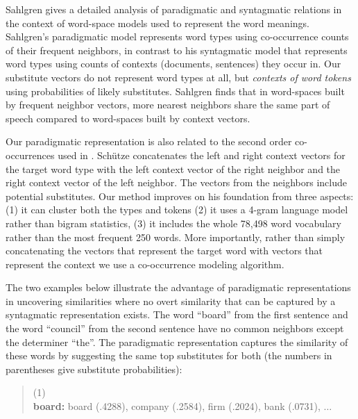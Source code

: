 Sahlgren  gives a detailed analysis of
paradigmatic and syntagmatic relations in the context of word-space
models used to represent the word meanings.  Sahlgren's paradigmatic
model represents word types using co-occurrence counts of their
frequent neighbors, in contrast to his syntagmatic model that
represents word types using counts of contexts (documents, sentences)
they occur in.  Our substitute vectors do not represent word types at
all, but {\em contexts of word tokens} using probabilities of likely
substitutes.  Sahlgren finds that in word-spaces built by frequent
neighbor vectors, more nearest neighbors share the same part of speech
compared to word-spaces built by context vectors.

Our paradigmatic representation is also related to the second order
co-occurrences used in \cite{Schutze:1995:DPT:976973.976994}.
Sch{\"u}tze concatenates the left and right context vectors for the
target word type with the left context vector of the right neighbor
and the right context vector of the left neighbor.  The vectors from
the neighbors include potential substitutes.  Our method improves on
his foundation from three aspects: (1) it can cluster both the types
and tokens (2) it uses a 4-gram language model rather than bigram
statistics, (3) it includes the whole 78,498 word vocabulary rather
than the most frequent 250 words.  More importantly, rather than
simply concatenating the vectors that represent the target word with
vectors that represent the context we use a co-occurrence modeling
algorithm.

The two examples below illustrate the advantage of paradigmatic
representations in uncovering similarities where no overt similarity
that can be captured by a syntagmatic representation exists.  The word
``board'' from the first sentence and the word ``council'' from the
second sentence have no common neighbors except the determiner
``the''.  The paradigmatic representation captures the similarity of
these words by suggesting the same top substitutes for both (the
numbers in parentheses give substitute probabilities):
\begin{quote}
 (1) \\
 {\bf board:} board (.4288), company (.2584), firm (.2024), bank (.0731), $\ldots$
\end{quote}

